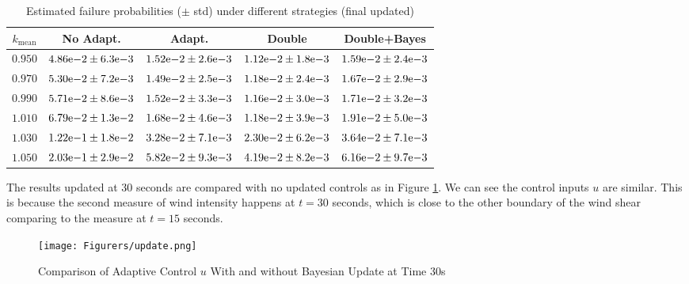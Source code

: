\begin{table}[ht]
    \centering
    \begin{tabular}{ccccc}
    \toprule
    \textbf{$k_{\text{mean}}$} & \textbf{No Adapt.} & \textbf{Adapt.} & \textbf{Double} & \textbf{Double+Bayes} \\
    \midrule
    $0.950$ & $4.86{\rm e}{-2} \pm 6.3{\rm e}{-3}$ & $1.52{\rm e}{-2} \pm 2.6{\rm e}{-3}$ & $1.12{\rm e}{-2} \pm 1.8{\rm e}{-3}$ & $1.59{\rm e}{-2} \pm 2.4{\rm e}{-3}$ \\
    \midrule
    $0.970$ & $5.30{\rm e}{-2} \pm 7.2{\rm e}{-3}$ & $1.49{\rm e}{-2} \pm 2.5{\rm e}{-3}$ & $1.18{\rm e}{-2} \pm 2.4{\rm e}{-3}$ & $1.67{\rm e}{-2} \pm 2.9{\rm e}{-3}$ \\
    \midrule
    $0.990$ & $5.71{\rm e}{-2} \pm 8.6{\rm e}{-3}$ & $1.52{\rm e}{-2} \pm 3.3{\rm e}{-3}$ & $1.16{\rm e}{-2} \pm 3.0{\rm e}{-3}$ & $1.71{\rm e}{-2} \pm 3.2{\rm e}{-3}$ \\
    \midrule
    $1.010$ & $6.79{\rm e}{-2} \pm 1.3{\rm e}{-2}$ & $1.68{\rm e}{-2} \pm 4.6{\rm e}{-3}$ & $1.18{\rm e}{-2} \pm 3.9{\rm e}{-3}$ & $1.91{\rm e}{-2} \pm 5.0{\rm e}{-3}$ \\
    \midrule
    $1.030$ & $1.22{\rm e}{-1} \pm 1.8{\rm e}{-2}$ & $3.28{\rm e}{-2} \pm 7.1{\rm e}{-3}$ & $2.30{\rm e}{-2} \pm 6.2{\rm e}{-3}$ & $3.64{\rm e}{-2} \pm 7.1{\rm e}{-3}$ \\
    \midrule
    $1.050$ & $2.03{\rm e}{-1} \pm 2.9{\rm e}{-2}$ & $5.82{\rm e}{-2} \pm 9.3{\rm e}{-3}$ & $4.19{\rm e}{-2} \pm 8.2{\rm e}{-3}$ & $6.16{\rm e}{-2} \pm 9.7{\rm e}{-3}$ \\
    \bottomrule
    \end{tabular}
    \caption{Estimated failure probabilities ($\pm$ std) under different strategies (final updated)}
    \label{tab:failure_probabilities15}
\end{table}    

The results updated at 30 seconds are compared with no updated controls as in Figure \ref{fig:update}. We can see the control inputs $u$ are similar. This is because the second measure of wind intensity happens at $t=30$ seconds, which is close to the other boundary of the wind shear comparing to the measure at $t=15$ seconds.

\begin{figure}
    \centering
    \texttt{[image: Figurers/update.png]}
    \caption{Comparison of Adaptive Control $u$ With and without Bayesian Update at Time $30$s}
    \label{fig:update}
\end{figure}

